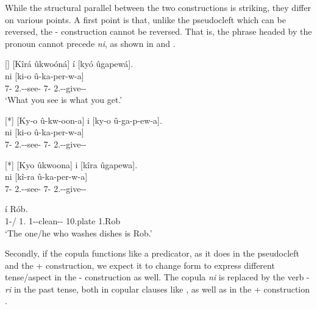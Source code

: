\documentclass[output=paper]{langscibook}
\begin{document}
\z


While the structural parallel between the two constructions is striking, they differ on various points. A first point is that, unlike the pseudocleft which can be reversed, the \NI-\PRO{} construction cannot be reversed. That is, the phrase headed by the pronoun cannot precede \textit{ni}, as shown in  and .

\ea
\label{bkm:Ref111714205}
\ea
[]{
[Kîrá  ûkwoóná]  í  [kyó  ûgapewá].\\
\gll
[kî-ra  û-kû-on-a]  ni  [ki-o  û-ka-per-w-a]\\
{\db}7-\RM{} 2\SG.\SM-\PRS{}-see-\FV{} \COP{} {\db}7-\PRO{} 2\SG.\SM-\FUT{}-give-\PASS-\FV{}\\
\glt
‘What you see is what you get.’
}

\ex
[*]{
[Ky-o  û-kw-oon-a]  i  [ky-o  û-ga-p-ew-a].\\
\gll
[ki-o  û-kû-on-a]  ni  [ki-o  û-ka-per-w-a]\\
{\db}7-\PRO{} 2\SG.\SM-\PRS{}-see-\FV{} \COP{} {\db}7-\PRO{} 2\SG.\SM-\FUT{}-give-\PASS-\FV{}\\
\glt 
}

\ex
[*]{
[Kyo  ûkwoona]  i  [kîra  ûgapewa].\\
\gll
[ki-o  û-kû-on-a]  ni  [kî-ra  û-ka-per-w-a]\\
{\db}7-\PRO{} 2\SG.\SM-\PRS{}-see-\FV{} \COP{} {\db}7-\RM{} 2\SG.\SM-\FUT{}-give-\PASS-\FV{}\\
\glt 
}

\z
\z

\ea
\label{bkm:Ref111714207}
  í  Rób.\\
{\db}1-\RM{}/  1.\PRO{} 1\RM-\PRS{}-clean-\IC{}-\FV{} 10.plate \COP{} 1.Rob\\
\glt
‘The one/he who washes dishes is Rob.’

\z

Secondly, if the copula functions like a predicator, as it does in the pseudocleft and the \NI+\RM{} construction, we expect it to change form to express different tense/aspect in the \NI-\PRO{} construction as well. The copula \textit{ni} is replaced by the verb -\textit{ri} in the past tense, both in copular clauses like , as well as in the \NI+\RM{} construction .
\end{document}
